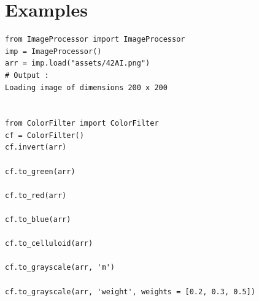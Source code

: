 \documentclass{42-en}
\begin{document}
\section*{Examples}
\begin{verbatim}
from ImageProcessor import ImageProcessor
imp = ImageProcessor()
arr = imp.load("assets/42AI.png")
# Output :
Loading image of dimensions 200 x 200


from ColorFilter import ColorFilter
cf = ColorFilter()
cf.invert(arr)

cf.to_green(arr)

cf.to_red(arr)

cf.to_blue(arr)

cf.to_celluloid(arr)

cf.to_grayscale(arr, 'm')

cf.to_grayscale(arr, 'weight', weights = [0.2, 0.3, 0.5])
\end{verbatim}
\end{document}
